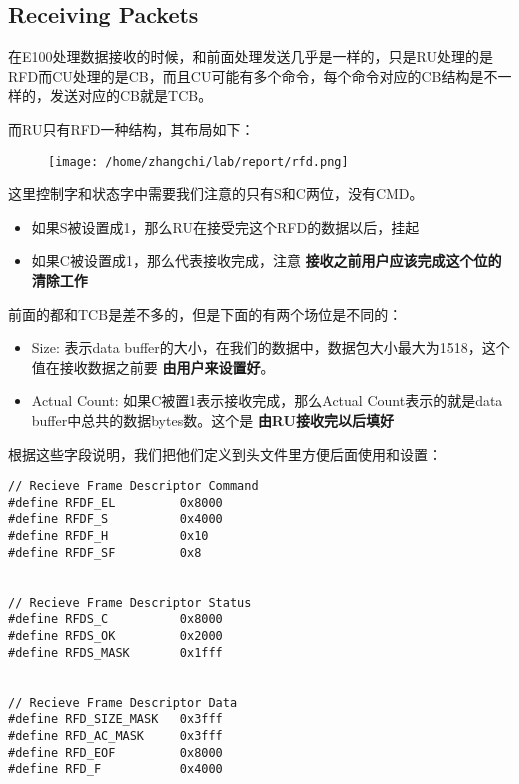 \documentclass{article}
\newcommand{\highlight}[1]{{\bfseries \color{red}  #1}}
\begin{document}
\begin{CJK*}{UTF8}{gkai}
\subsection{Receiving Packets}


在E100处理数据接收的时候，和前面处理发送几乎是一样的，只是RU处理的是RFD而CU处理的是CB，而且CU可能有多个命令，每个命令对应的CB结构是不一样的，发送对应的CB就是TCB。

而RU只有RFD一种结构，其布局如下：

\begin{figure}[htp]
\centering
\texttt{[image: /home/zhangchi/lab/report/rfd.png]}
\end{figure}

这里控制字和状态字中需要我们注意的只有S和C两位，没有CMD。
\begin{itemize}
\item{如果S被设置成1，那么RU在接受完这个RFD的数据以后，挂起}
\item{如果C被设置成1，那么代表接收完成，注意\highlight{接收之前用户应该完成这个位的清除工作}}
\end{itemize}

前面的都和TCB是差不多的，但是下面的有两个场位是不同的：

\begin{itemize}
\item{Size: 表示data buffer的大小，在我们的数据中，数据包大小最大为1518，这个值在接收数据之前要\highlight{由用户来设置好}。}
\item{Actual Count: 如果C被置1表示接收完成，那么Actual Count表示的就是data buffer中总共的数据bytes数。这个是\highlight{由RU接收完以后填好}}
\end{itemize}

根据这些字段说明，我们把他们定义到头文件里方便后面使用和设置：

\begin{lstlisting}[style=ccode, title={\scriptsize \ttfamily \bfseries kern/e100.h}]
// Recieve Frame Descriptor Command
#define RFDF_EL         0x8000
#define RFDF_S          0x4000
#define RFDF_H          0x10
#define RFDF_SF         0x8


// Recieve Frame Descriptor Status
#define RFDS_C          0x8000
#define RFDS_OK         0x2000
#define RFDS_MASK       0x1fff


// Recieve Frame Descriptor Data
#define RFD_SIZE_MASK   0x3fff
#define RFD_AC_MASK     0x3fff
#define RFD_EOF         0x8000
#define RFD_F           0x4000
\end{lstlisting}


\end{CJK*}
\end{document}
